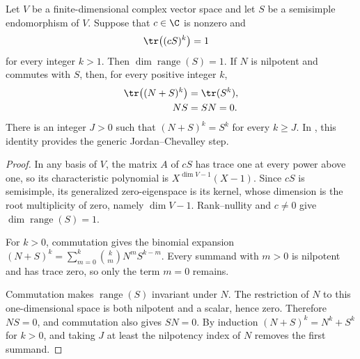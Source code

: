 \begin{lemma}
    \label{thm:mpu_semisimple_scaled_trace_rank_one}
    \leanok
    Let $V$ be a finite-dimensional complex vector space and let $S$ be a
    semisimple endomorphism of $V$. Suppose that $c\in\C$ is nonzero and
    \begin{align}
        \tr\bigl((cS)^k\bigr) & =1
        \notag
    \end{align}
    for every integer $k>1$. Then $\dim\operatorname{range}(S)=1$.
    If $N$ is nilpotent and commutes with $S$, then, for every positive
    integer $k$,
    \begin{align}
        \tr\bigl((N+S)^k\bigr) & =\tr(S^k), \notag \\
        NS                     & =SN=0. \notag
    \end{align}
    There is an integer $J>0$ such that $(N+S)^k=S^k$ for every $k\geq J$.
    In \cite[Proposition~20, lines~3839--3866]{Molnar2018SemiInjective},
    this identity provides the generic Jordan--Chevalley step.
\end{lemma}

\begin{proof}
    \leanok
    In any basis of $V$, the matrix $A$ of $cS$ has trace one at every power
    above one, so its characteristic polynomial is $X^{\dim V-1}(X-1)$.
    Since $cS$ is semisimple, its generalized zero-eigenspace is its kernel,
    whose dimension is the root multiplicity of zero, namely $\dim V-1$.
    Rank--nullity and $c\ne0$ give $\dim\operatorname{range}(S)=1$.

    For $k>0$, commutation gives the binomial expansion
    $(N+S)^k=\sum_{m=0}^k \binom{k}{m}N^mS^{k-m}$. Every summand with $m>0$
    is nilpotent and has trace zero, so only the term $m=0$ remains.

    Commutation makes $\operatorname{range}(S)$ invariant under $N$. The
    restriction of $N$ to this one-dimensional space is both nilpotent and a
    scalar, hence zero. Therefore $NS=0$, and commutation also gives $SN=0$.
    By induction $(N+S)^k=N^k+S^k$ for $k>0$, and taking $J$ at least the
    nilpotency index of $N$ removes the first summand.
\end{proof}
